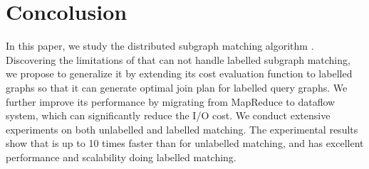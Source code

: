 \section{Concolusion}
\label{sec:conclusion}
In this paper, we study the distributed subgraph matching algorithm \cliquejoin. Discovering the limitations of \cliquejoin that can not handle labelled subgraph matching, we propose \gencliqjoin to generalize it by extending its cost evaluation function to labelled graphs so that it can generate optimal join plan for labelled query graphs. We further improve its performance by migrating \cliquejoin from MapReduce to \timely dataflow system, which can significantly reduce the I/O cost. We conduct extensive experiments on both unlabelled and labelled matching. The experimental results show that \gencliqjoin is up to 10 times faster than \cliquejoin for unlabelled matching, and has excellent performance and scalability doing labelled matching.